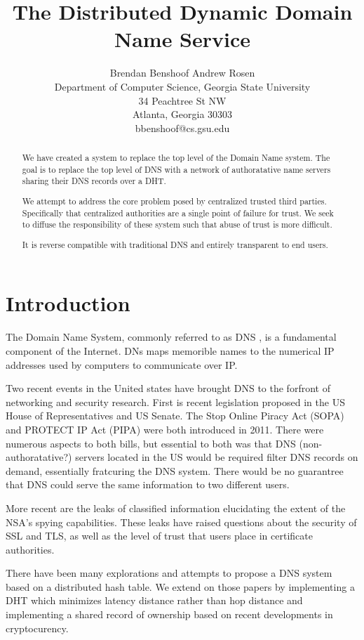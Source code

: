 \documentclass[11pt]{IEEEtran} %
\title{The Distributed Dynamic Domain Name Service}
\author{
Brendan Benshoof \qquad Andrew Rosen  \\Department of Computer Science, Georgia State University\\ 34 Peachtree St NW \\ Atlanta, Georgia 30303\\  bbenshoof@cs.gsu.edu }
\begin{document}
\maketitle

\begin{abstract}
We have created a system to replace the top level of the Domain Name system. The goal is to replace the top level of DNS with a network of authoratative name servers sharing their DNS records over a DHT.

We attempt to address the core problem posed by centralized trusted third parties. Specifically that centralized authorities are a single point of failure for trust. We seek to diffuse the responsibility of these system such that abuse of trust is more difficult.

It is reverse compatible with traditional DNS and entirely transparent to end users.


\end{abstract}


\section{Introduction}
The Domain Name System, commonly referred to as DNS \cite{mockapetris2003rfc} \cite{mockapetris2004rfc}, is a fundamental component of the Internet.  DNs maps memorible names to the numerical IP addresses used by computers to communicate over IP. 

Two recent events in the United states have brought DNS to the forfront of networking and security research.  First is recent legislation proposed in the US House of Representatives and US Senate. The Stop Online Piracy Act (SOPA) \cite{sopa} and PROTECT IP Act (PIPA) \cite{pipa} were both introduced in 2011.  There were numerous aspects to both bills, but essential to both was that DNS (non-authoratative?) servers located in the US would be required filter DNS records on demand, essentially fratcuring the DNS system.  There would be no guarantree that DNS could serve the same information to two different users.


More recent are the leaks of classified information elucidating the extent of the NSA's spying capabilities. These leaks have raised questions about the security of SSL and TLS, as well as the level of trust that users place in certificate authorities.

There have been many explorations and attempts\cite{cox}\cite{pappas}\cite{ramasubramanian2004design} to propose a DNS system based on a distributed hash table\cite{chord}. We extend on those papers by implementing a DHT which minimizes latency distance rather than hop distance and implementing a shared record of ownership based on recent developments in cryptocurency.\cite{bitcoin}\cite{namecoin}
\end{document}
